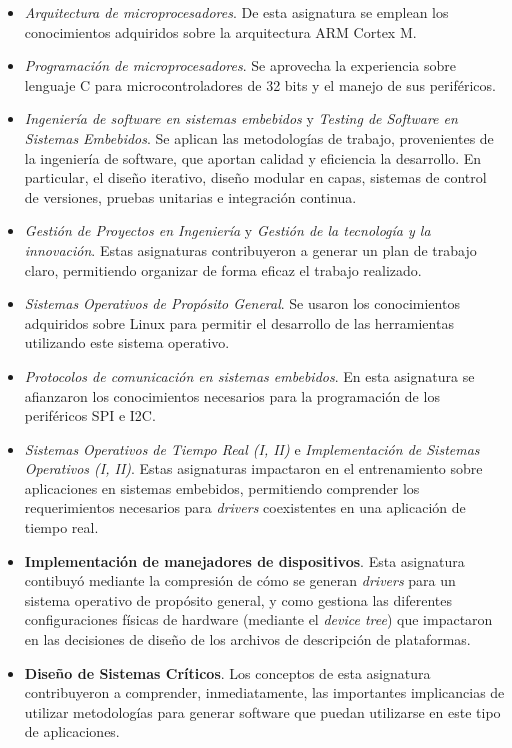 \begin{itemize}
\item
\emph{Arquitectura de microprocesadores}. De esta asignatura se emplean los conocimientos adquiridos sobre la arquitectura ARM Cortex M. 
\item
\emph{Programación de microprocesadores}. Se aprovecha la experiencia sobre lenguaje C para microcontroladores de 32 bits y el manejo de sus periféricos.
\item
\emph{Ingeniería de software en sistemas embebidos} y \emph{Testing de Software en Sistemas Embebidos}. Se aplican las metodologías de trabajo, provenientes de la ingeniería de software, que aportan calidad y eficiencia la desarrollo. En particular, el diseño iterativo, diseño modular en capas, sistemas de control de versiones, pruebas unitarias e integración  continua.
\item
\emph{Gestión de Proyectos en Ingeniería} y \emph{Gestión de la tecnología y la innovación}. Estas asignaturas contribuyeron a generar un plan de trabajo claro, permitiendo organizar de forma eficaz el trabajo realizado. 
\item
\emph{Sistemas Operativos de Propósito General}. Se usaron los conocimientos adquiridos sobre Linux para permitir el desarrollo de las herramientas utilizando este sistema operativo.
\item
\emph{Protocolos de comunicación en sistemas embebidos}. En esta asignatura se afianzaron los conocimientos necesarios para la programación de los periféricos SPI e I2C.
\item
\emph{Sistemas Operativos de Tiempo Real (I, II)} e \emph{Implementación de Sistemas Operativos (I, II)}. Estas asignaturas impactaron en el entrenamiento sobre aplicaciones en sistemas embebidos, permitiendo comprender los requerimientos necesarios para \emph{drivers} coexistentes en una aplicación de tiempo real.
\item
\textbf{Implementación de manejadores de dispositivos}. Esta asignatura contibuyó mediante la compresión de cómo se generan \emph{drivers} para un sistema operativo de propósito general, y como gestiona las diferentes configuraciones físicas de hardware (mediante el \emph{device tree}) que impactaron en las decisiones de diseño de los archivos de descripción de plataformas.
\item
\textbf{Diseño de Sistemas Críticos}. Los conceptos de esta asignatura contribuyeron a comprender, inmediatamente, las importantes implicancias de utilizar metodologías para generar software que puedan utilizarse en este tipo de aplicaciones.
\end{itemize}

